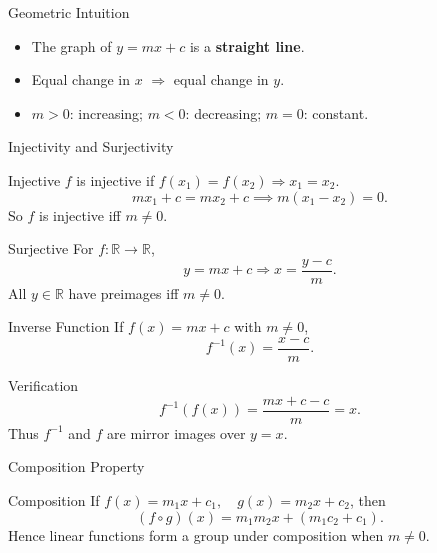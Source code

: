 \documentclass[aspectratio=169,10pt]{beamer}
\begin{document}
\begin{frame}{Geometric Intuition}
\begin{itemize}
    \item The graph of \(y = mx + c\) is a \textbf{straight line}.
    \item Equal change in \(x\) $\Rightarrow$ equal change in \(y\).
    \item \(m>0\): increasing; \(m<0\): decreasing; \(m=0\): constant.
\end{itemize}
\end{frame}

\begin{frame}{Injectivity and Surjectivity}
\begin{block}{Injective}
\(f\) is injective if \(f(x_1)=f(x_2)\Rightarrow x_1=x_2\).
\[
mx_1+c = mx_2+c \implies m(x_1-x_2)=0.
\]
So \(f\) is injective iff \(m\neq0\).
\end{block}
\pause
\begin{block}{Surjective}
For \(f:\mathbb{R}\to\mathbb{R}\),
\[
y=mx+c \Rightarrow x=\frac{y-c}{m}.
\]
All \(y\in\mathbb{R}\) have preimages iff \(m\neq0\).
\end{block}
\end{frame}

\begin{frame}{Inverse Function}
If \(f(x)=mx+c\) with \(m\neq0\),
\[
f^{-1}(x) = \frac{x-c}{m}.
\]

\pause
\begin{exampleblock}{Verification}
\[
f^{-1}(f(x)) = \frac{mx+c-c}{m}=x.
\]
Thus \(f^{-1}\) and \(f\) are mirror images over \(y=x\).
\end{exampleblock}
\end{frame}

\begin{frame}{Composition Property}
\begin{exampleblock}{Composition}
If \(f(x)=m_1x+c_1,\quad g(x)=m_2x+c_2\), then
\[
(f\circ g)(x)=m_1m_2x+(m_1c_2+c_1).
\]
Hence linear functions form a group under composition when \(m\neq0\).
\end{exampleblock}
\end{frame}
\end{document}
